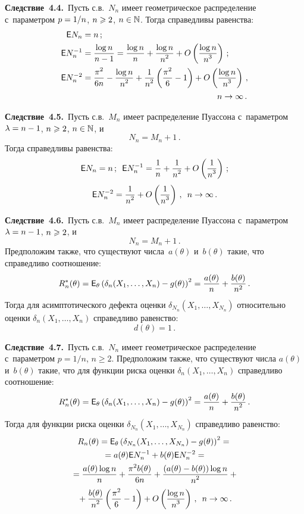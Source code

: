\begin{multicols}{2}
\noindent
\textbf{Следствие~4.4.}\ 
Пусть с.в.~$N_n$ имеет геометрическое распределение 
с~параметром $p\hm = 1/n$, $n\hm \geqslant 2$, $n\hm \in \mathbb{N}$. 
Тогда справедливы равенства:
\begin{align*}
{\sf E} N_n &= n\,;
\\
{\sf E} N_n^{-1} &= \fr{\log n}{n - 1} = 
\fr{\log n}{n} + \fr{\log n}{n^2} + O\left(\fr{\log n}{n^3}\right)\,;
\\
{\sf E} N_n^{-2} &= \fr{\pi^2}{6n} - \fr{\log n}{n^2} + 
\fr{1}{n^2} \left(\fr{\pi^2}{6} - 1\right) + O\left(\fr{\log n}{n^3}\right)\,,\\
&\hspace*{57mm}n \to \infty\,.
\end{align*}


\noindent
\textbf{Следствие~4.5.}\ 
Пусть с.в.~$M_n$ имеет распределение Пуассона с~параметром 
$\lambda\hm = n \hm- 1$, $n\hm \geqslant 2$, $n\hm \in \mathbb{N}$, и~$$
N_n = M_n + 1\,.
$$
Тогда справедливы равенства:
$$
{\sf E} N_n = n\,;\enskip
{\sf E} N_n^{-1} = \displaystyle\frac{\displaystyle 1\mathstrut}{\displaystyle n\mathstrut} + \displaystyle\frac{\displaystyle 1\mathstrut}{\displaystyle n^2\mathstrut} + O \left(\displaystyle\frac{\displaystyle 1\mathstrut}{\displaystyle n^3\mathstrut}\right)\,;
$$
$$
{\sf E} N_n^{-2} = \displaystyle\frac{\displaystyle 1\mathstrut}{\displaystyle n^2\mathstrut} + O\left(\displaystyle\frac{\displaystyle 1\mathstrut}{\displaystyle n^3\mathstrut}\right)\,,\enskip
n \to \infty\,.
$$


\noindent
\textbf{Следствие~4.6.}\ 
Пусть с.в.~$M_n$ имеет распределение Пуассона 
с~параметром $\lambda\hm = n\hm-1$,  $n\hm \geqslant 2$, и~$$
N_n = M_n + 1\,.
$$
Предположим также, что существуют числа~$a(\theta)$ и~$b(\theta)$ 
такие, что справедливо соотношение:
$$ %
R^*_n(\theta) = {\sf E}_\theta\left(\delta_{n}(X_1,\ldots,X_{n}) - g(\theta)\right)^2 
= \fr{a(\theta)}{n} + \frac{b(\theta)}{n^2}\,.
$$ %
Тогда для асимптотического дефекта оценки $\delta_{N_n}(X_1,\ldots,X_{N_n})$ 
относительно оценки $\delta_n(X_1,\ldots,X_n)$ справедливо равенство:
$$
d(\theta) = 1\,.
$$

\noindent
\textbf{Следствие~4.7.}\ Пусть с.в.~$N_n$ имеет геометрическое распределение 
с~параметром $p = 1/n$, $n \geqslant 2$.
Предположим также, что существуют числа $a(\theta)$  и~$b(\theta)$ такие, 
что для функции риска оценки $\delta_{n}(X_1,\ldots,X_{n})$ справедливо соотношение:
$$ %
R^*_n(\theta) = {\sf E}_\theta\left(\delta_{n}(X_1,\ldots,X_{n}) -
 g(\theta)\right)^2 
= \fr{a(\theta)}{n} + \fr{b(\theta)}{n^2}\,.
$$ %
Тогда для функции риска оценки $\delta_{N_n}(X_1,\ldots,X_{N_n})$ справедливо 
равенство:
\begin{multline*}
R_n(\theta) = {\sf E}_\theta\left(\delta_{N_n}(X_1,\ldots,X_{N_n}) - 
g(\theta)\right)^2 ={}
\\
{}= a(\theta) {\sf E} N_n^{-1} + b(\theta) {\sf E} N_n^{-2} ={}
\\
{}= \displaystyle\frac{\displaystyle a(\theta) \log n\mathstrut}{\displaystyle n\mathstrut} + \displaystyle\frac{\displaystyle \pi^2 b(\theta)\mathstrut}{\displaystyle 6n\mathstrut} +
\displaystyle\frac{\displaystyle (a(\theta) - b(\theta)) \log n\mathstrut}{\displaystyle n^2\mathstrut} +{}
\\
{}+ \displaystyle\frac{\displaystyle b(\theta)\mathstrut}{\displaystyle n^2\mathstrut} \left(\displaystyle\frac{\displaystyle \pi^2\mathstrut}{\displaystyle 6\mathstrut} - 1\right) + O
\left(\displaystyle\frac{\displaystyle \log n\mathstrut}{\displaystyle n^3\mathstrut}\right)\,,\enskip n \to \infty\,.
\end{multline*}


\end{multicols}
